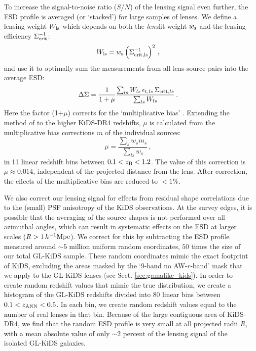 \documentclass[usenatbib]{mnras}
\newcommand{\hMpc}{\, h^{-1}{\rm{Mpc}} }
\newcommand{\un}[1]{_{\rm #1}}
\begin{document}
To increase the signal-to-noise ratio ($S/N$) of the lensing signal even further, the ESD profile is averaged (or `stacked') for large samples of lenses. We define a lensing weight $W\un{ls}$ which depends on both the \emph{lens}fit weight $w\un{s}$ and the lensing efficiency $\Sigma\un{crit}^{-1}$:
\begin{equation}
	W\un{ls} = w\un{s} \left( \Sigma\un{crit,ls}^{-1} \right)^2 \, ,
	\label{eq:weights}
\end{equation}
and use it to optimally sum the measurements from all lens-source pairs into the average ESD:
\begin{equation}
	\Delta\Sigma = \frac{1}{1+\mu} \frac{\sum_{ls} W_{ls} \, \epsilon_{{\rm t},ls} \, \Sigma_{{\rm crit},ls} }{ \sum_{ls}{W_{ls}} }  \, .
	\label{eq:ESDmeasured}
\end{equation}
Here the factor (1+$\mu$) corrects for the `multiplicative bias' \cite[]{fenechconti2017}. Extending the method of \cite{dvornik2017} to the higher KiDS-DR4 redshifts, $\mu$ is calculated from the multiplicative bias corrections $m$ of the individual sources:
\begin{equation}
	\mu=\frac{\sum_{s} w_{s} m_{s}}{\sum_{ls} w_{s}} \, ,
	\label{eq:biascorr}
\end{equation}
in 11 linear redshift bins between \mbox{$0.1<z\un{B}<1.2$}. The value of this correction is $\mu\approx0.014$, independent of the projected distance from the lens. After correction, the effects of the multiplicative bias are reduced to $<1\%$.

We also correct our lensing signal for effects from residual shape correlations due to the (small) PSF anisotropy of the KiDS observations. At the survey edges, it is possible that the averaging of the source shapes is not performed over all azimuthal angles, which can result in systematic effects on the ESD at larger scales ($R>1\hMpc$). We correct for this by subtracting the ESD profile measured around $\sim5$ million uniform random coordinates, $50$ times the size of our total GL-KiDS sample. These random coordinates mimic the exact footprint of KiDS, excluding the areas masked by the `9-band no AW-$r$-band' mask that we apply to the GL-KiDS lenses (see Sect. \ref{sec:gamalike_kids}). In order to create random redshift values that mimic the true distribution, we create a histogram of the GL-KiDS redshifts divided into $80$ linear bins between $0.1<z\un{ANN}<0.5$. In each bin, we create random redshift values equal to the number of real lenses in that bin. Because of the large contiguous area of KiDS-DR4, we find that the random ESD profile is very small at all projected radii $R$, with a mean absolute value of only $\sim2$ percent of the lensing signal of the isolated GL-KiDS galaxies. 
\end{document}
